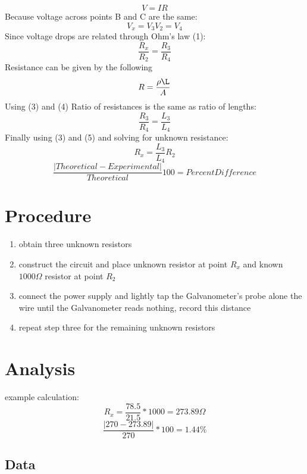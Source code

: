 \documentclass[12pt, letterpaper]{article}
\begin{document}
\begin{equation}
V=IR
\end{equation}
Because voltage across points B and C are the same:
\begin{equation}
V_x = V_3
V_2 = V_4
\end{equation}
Since voltage drops are related through Ohm's law (1):
\begin{equation}
\frac{R_x}{R_2} = \frac{R_3}{R_4}
\end{equation}
Resistance can be given by the following
\begin{equation}
R = \frac{\rho\L}{A}
\end{equation}
Using (3) and (4) Ratio of resistances is the same as ratio of lengths:
\begin{equation}
\frac{R_3}{R_4} = \frac{L_3}{L_4}
\end{equation}
Finally using (3) and (5) and solving for unknown resistance:
\begin{equation}
R_x = \frac{L_3}{L_4}R_2
\end{equation}
\begin{equation}
\frac{|Theoretical - Experimental|}{Theoretical}100 = Percent Difference
\end{equation}

\section*{Procedure}
\begin{enumerate}
\item obtain three unknown resistors
\item construct the circuit and place unknown resistor at point \(R_x\) and known \(1000\Omega\) resistor at point \(R_2\)
\item connect the power supply and lightly tap the Galvanometer's probe alone the wire until the Galvanometer reads nothing, record this distance
\item repeat step three for the remaining unknown resistors
\end{enumerate}
\section*{Analysis}
example calculation:
\[R_x = \frac{78.5}{21.5}*1000 = 273.89\Omega\]
\[\frac{|270 - 273.89|}{270}*100 = 1.44\%\]
\subsection*{Data}
\begin{table}[H]
\end{table}
\end{document}
